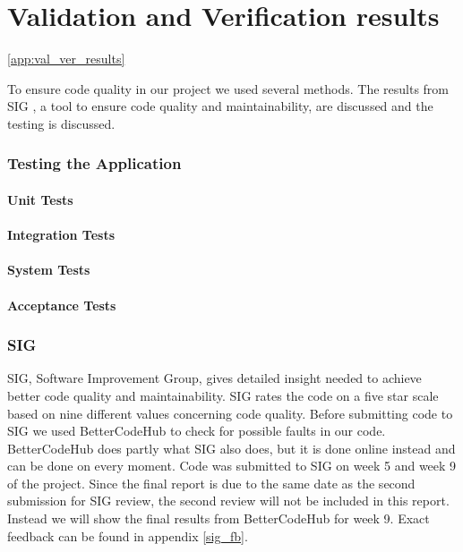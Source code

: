 \chapter{Validation and Verification results}\ref{app:val_ver_results}

To ensure code quality in our project we used several methods. The results from SIG \cite{sig}, a tool to ensure code quality and maintainability, are discussed and the testing is discussed.


\subsection{Testing the Application}

\subsubsection{Unit Tests}

\subsubsection{Integration Tests}

\subsubsection{System Tests}

\subsubsection{Acceptance Tests}

\subsection{SIG}
SIG, Software Improvement Group, gives detailed insight needed to achieve better code quality and maintainability. SIG rates the code on a five star scale based on nine different values concerning code quality. Before submitting code to SIG we used BetterCodeHub\cite{better_code_hub} to check for possible faults in our code. BetterCodeHub does partly what SIG also does, but it is done online instead and can be done on every moment. Code was submitted to SIG on week 5 and week 9 of the project. Since the final report is due to the same date as the second submission for SIG review, the second review will not be included in this report. Instead we will show the final results from BetterCodeHub for week 9. Exact feedback can be found in appendix \ref{sig_fb}.


